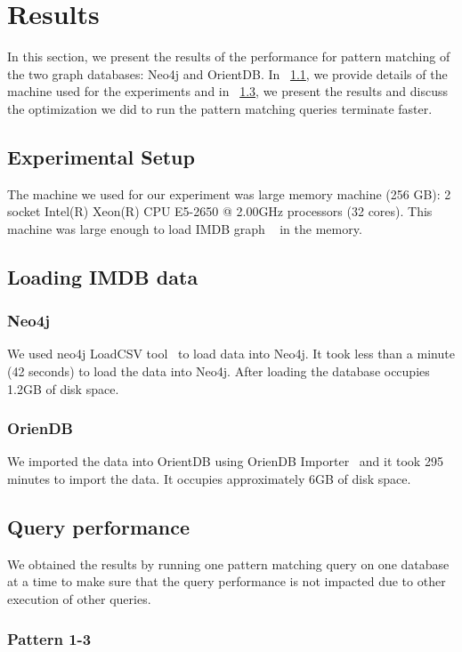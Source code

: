 
\section{Results}
In this section, we present the results of the performance for pattern matching of the two graph databases: Neo4j and OrientDB. In ~\ref{setup}, we provide details of the machine used for the experiments and in ~\ref{result}, we present the results and discuss the optimization we did to run the pattern matching queries terminate faster.

\subsection{Experimental Setup}
\label{setup}

The machine we used for our experiment was large memory machine (256 GB): 2 socket Intel(R) Xeon(R) CPU E5-2650 @ 2.00GHz processors (32 cores). This machine was large enough to load IMDB graph ~\cite{IMDb96:online} in the memory.

\subsection{Loading IMDB data}
\subsubsection{ Neo4j}
We used neo4j LoadCSV tool~\cite{CSVImpor74:online} to load data into Neo4j. It took less than a minute (42 seconds) to load the data into Neo4j. After loading the database occupies 1.2GB of disk space.

\subsubsection{OrienDB}
We imported the data into OrientDB using OrienDB Importer~\cite{orientdb_importer} and it took 295 minutes to import the data. It occupies approximately 6GB of disk space.

\subsection{Query performance}
\label{result}
We obtained the results by running one pattern matching query on one database at a time to make sure that the query performance is not impacted due to other execution of other queries.

\subsubsection{Pattern 1-3}

